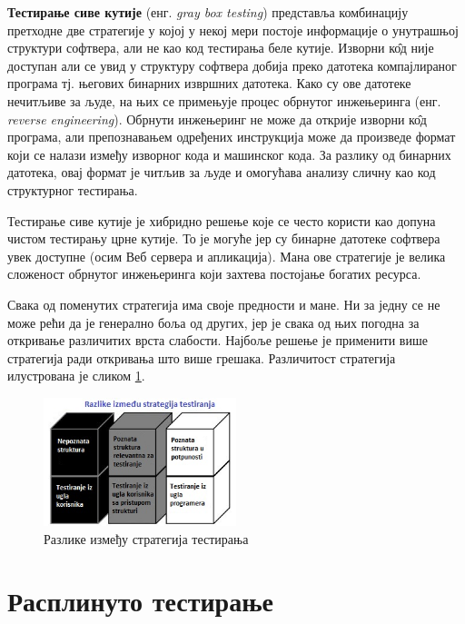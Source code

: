 \documentclass[12pt,oneside]{memoir}
\begin{document}
\begin{description}
\item \textbf{Тестирање сиве кутије} (енг. \textit{gray box testing}) представља комбинацију претходне две стратегије у којој у некој мери постоје информације о унутрашњој структури софтвера, али не као код тестирања беле кутије. Изворни к\^{о}д није доступан али се увид у структуру софтвера добија преко датотека компајлираног програма тј. његових бинарних извршних датотека. Како су ове датотеке нечитљиве за људе, на њих се примењује процес обрнутог инжењеринга (енг. \textit{reverse engineering}). Обрнути инжењеринг не може да открије изворни к\^{о}д програма, али препознавањем одређених инструкција може да произведе формат који се налази између изворног кода и машинског кода. За разлику од бинарних датотека, овај формат је читљив за људе и омогућава анализу сличну као код структурног тестирања. 
\par Тестирање сиве кутије је хибридно решење које се често користи као 	допуна чистом тестирању црне кутије. То је могуће јер су бинарне датотеке софтвера увек доступне (осим Веб сервера и апликација). Мана ове стратегије је велика сложеност обрнутог инжењеринга који захтева постојање богатих ресурса.
\end{description}

Свака од поменутих стратегија има своје предности и мане. Ни за једну се не може рећи да је генерално боља од других, јер је свака од њих погодна за откривање различитих врста слабости. Најбоље решење је применити више стратегија ради откривања што више грешака. Различитост стратегија илустрована је сликом \ref{fig:boxes}.

\begin{figure}[!ht]
\centering
\includegraphics[width=0.5\textwidth]{boxes.jpg}
\caption{Разлике између стратегија тестирања}
\label{fig:boxes}
\end{figure}

\section{Расплинуто тестирање}
\end{document}
